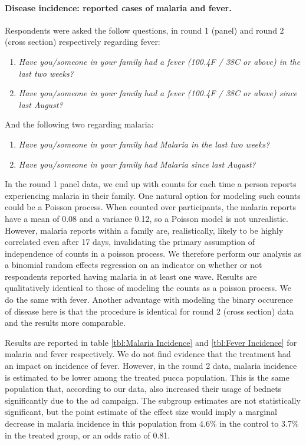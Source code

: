\documentclass[a4paper,12pt]{article}
\theoremstyle{proposition}
\begin{document}
\paragraph{Disease incidence: reported cases of malaria and fever.} Respondents were asked the follow questions, in round 1 (panel) and round 2 (cross section) respectively regarding fever:
\begin{enumerate}
\item \textit{Have you/someone in your family had a fever (100.4F / 38C or above) in the last two weeks?}
\item \textit{Have you/someone in your family had a fever (100.4F / 38C or above) since last August?}
\end{enumerate}

\noindent And the following two regarding malaria:
\begin{enumerate}
\item \textit{Have you/someone in your family had Malaria in the last two weeks?}
\item \textit{Have you/someone in your family had Malaria since last August?}
\end{enumerate}

In the round 1 panel data, we end up with counts for each time a person reports experiencing malaria in their family. One natural option for modeling such counts could be a Poisson process. When counted over participants, the malaria reports have a mean of 0.08 and a variance 0.12, so a Poisson model is not unrealistic. However, malaria reports within a family are, realistically, likely to be highly correlated even after 17 days, invalidating the primary assumption of independence of counts in a poisson process. We therefore perform our analysis as a binomial random effects regression on an indicator on whether or not respondents reported having malaria in at least one wave. Results are qualitatively identical to those of modeling the counts as a poisson process. We do the same with fever. Another advantage with modeling the binary occurence of disease here is that the procedure is identical for round 2 (cross section) data and the results more comparable.

Results are reported in table \ref{tbl:Malaria Incidence} and \ref{tbl:Fever Incidence} for malaria and fever respectively. We do not find evidence that the treatment had an impact on incidence of fever. However, in the round 2 data, malaria incidence is estimated to be lower among the treated pucca population. This is the same population that, according to our data, also increased their usage of bednets significantly due to the ad campaign. The subgroup estimates are not statistically significant, but the point estimate of the effect size would imply a marginal decrease in malaria incidence in this population from 4.6\% in the control to 3.7\% in the treated group, or an odds ratio of 0.81.
\end{document}
